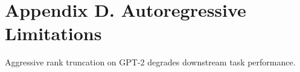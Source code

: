 \section*{Appendix D. Autoregressive Limitations}Aggressive rank truncation on GPT-2 degrades downstream task performance.
